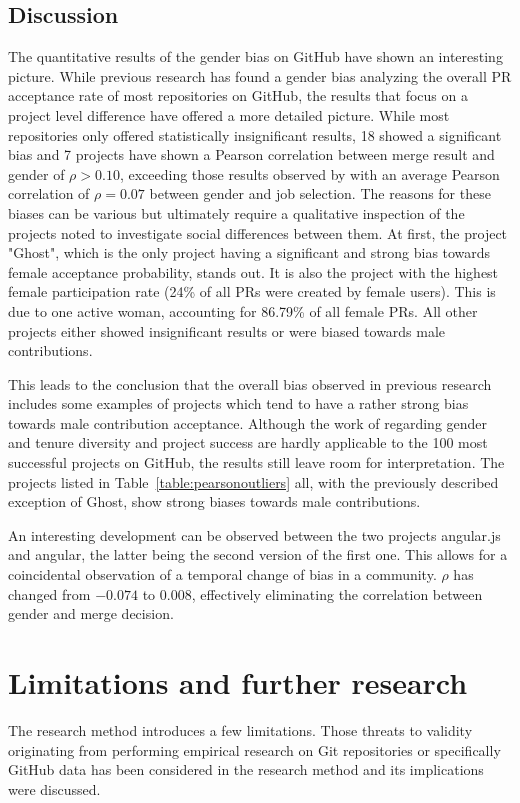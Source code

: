\subsection{Discussion}

The quantitative results of the gender bias on GitHub have shown an interesting picture. While previous research has found a gender bias analyzing the overall \ac{PR} acceptance rate of most repositories on GitHub, the results that focus on a project level difference have offered a more detailed picture. While most repositories only offered statistically insignificant results, 18 showed a significant bias and 7 projects have shown a Pearson correlation between merge result and gender of $\rho > 0.10$, exceeding those results observed by \citeauthor{Davison2000225} with an average Pearson correlation of $\rho = 0.07$ between gender and job selection. The reasons for these biases can be various but ultimately require a qualitative inspection of the projects noted to investigate social differences between them. At first, the project "Ghost", which is the only project having a significant and strong bias towards female acceptance probability, stands out. It is also the project with the highest female participation rate (24\% of all \ac{PR}s were created by female users). This is due to one active woman, accounting for 86.79\% of all female \ac{PR}s. All other projects either showed insignificant results or were biased towards male contributions.

This leads to the conclusion that the overall bias observed in previous research includes some examples of projects which tend to have a rather strong bias towards male contribution acceptance. Although the work of \citeauthor{Vasilescu:2015:GTD:2702123.2702549} regarding gender and tenure diversity and project success are hardly applicable to the 100 most successful projects on GitHub, the results still leave room for interpretation. The projects listed in Table~\ref{table:pearsonoutliers} all, with the previously described exception of Ghost, show strong biases towards male contributions.

An interesting development can be observed between the two projects angular.js and angular, the latter being the second version of the first one. This allows for a coincidental observation of a temporal change of bias in a community. $ \rho $ has changed from $ -0.074 $ to $0.008$, effectively eliminating the correlation between gender and merge decision.

\section{Limitations and further research}
The research method introduces a few limitations. Those threats to validity originating from performing empirical research on Git repositories \cite{perils-ms-research:2009} or specifically GitHub data \cite{perils-github:2015} has been considered in the research method and its implications were discussed.

